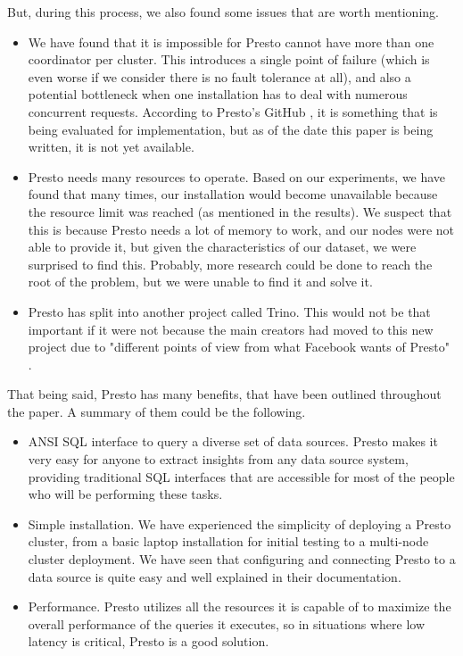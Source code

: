 \documentclass[conference]{IEEEtran}
\begin{document}
But, during this process, we also found some issues that are worth mentioning.

\begin{itemize}
    \item We have found that it is impossible for Presto cannot have more than one coordinator per cluster. This introduces a single point of failure (which is even worse if we consider there is no fault tolerance at all), and also a potential bottleneck when one installation has to deal with numerous concurrent requests. According to Presto's GitHub \cite{meehan-2020}, it is something that is being evaluated for implementation, but as of the date this paper is being written, it is not yet available.
    \item Presto needs many resources to operate. Based on our experiments, we have found that many times, our installation would become unavailable because the resource limit was reached (as mentioned in the results). We suspect that this is because Presto needs a lot of memory to work, and our nodes were not able to provide it, but given the characteristics of our dataset, we were surprised to find this. Probably, more research could be done to reach the root of the problem, but we were unable to find it and solve it.
    \item Presto has split into another project called Trino. This would not be that important if it were not because the main creators had moved to this new project due to "different points of view from what Facebook wants of Presto" \cite{traverso-2020}.
\end{itemize}

That being said, Presto has many benefits, that have been outlined throughout the paper. A summary of them could be the following.
\begin{itemize}
    \item ANSI SQL interface to query a diverse set of data sources. Presto makes it very easy for anyone to extract insights from any data source system, providing traditional SQL interfaces that are accessible for most of the people who will be performing these tasks.
    \item Simple installation. We have experienced the simplicity of deploying a Presto cluster, from a basic laptop installation for initial testing to a multi-node cluster deployment. We have seen that configuring and connecting Presto to a data source is quite easy and well explained in their documentation.
    \item Performance. Presto utilizes all the resources it is capable of to maximize the overall performance of the queries it executes, so in situations where low latency is critical, Presto is a good solution.
\end{itemize}
\end{document}

